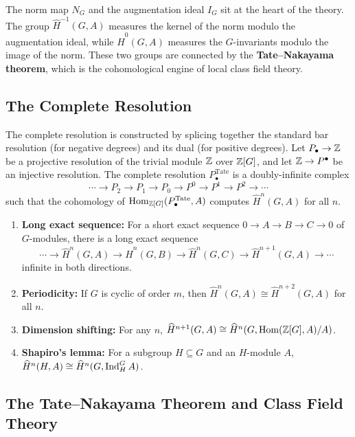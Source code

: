 The norm map \(N_G\) and the augmentation ideal \(I_G\) sit at the heart of the theory. The group \(\widehat{H}^{-1}(G,A)\) measures the kernel of the norm modulo the augmentation ideal, while \(\widehat{H}^{0}(G,A)\) measures the \(G\)-invariants modulo the image of the norm. These two groups are connected by the \textbf{Tate--Nakayama theorem}, which is the cohomological engine of local class field theory.

\subsection{The Complete Resolution}

The complete resolution is constructed by splicing together the standard bar resolution (for negative degrees) and its dual (for positive degrees). Let \(P_\bullet \to \mathbb{Z}\) be a projective resolution of the trivial module \(\mathbb{Z}\) over \(\mathbb{Z}[G]\), and let \(\mathbb{Z} \to P^\bullet\) be an injective resolution. The complete resolution \(P_\bullet^{\text{Tate}}\) is a doubly-infinite complex
\[
\cdots \longrightarrow P_2 \longrightarrow P_1 \longrightarrow P_0 \longrightarrow P^0 \longrightarrow P^1 \longrightarrow P^2 \longrightarrow \cdots
\]
such that the cohomology of \(\operatorname{Hom}_{\mathbb{Z}[G]}(P_\bullet^{\text{Tate}}, A)\) computes \(\widehat{H}^n(G,A)\) for all \(n\).

\begin{theorem}
\begin{enumerate}
    \item \textbf{Long exact sequence:} For a short exact sequence \(0 \to A \to B \to C \to 0\) of \(G\)-modules, there is a long exact sequence
    \[
    \cdots \to \widehat{H}^{n}(G,A) \to \widehat{H}^{n}(G,B) \to \widehat{H}^{n}(G,C) \to \widehat{H}^{n+1}(G,A) \to \cdots
    \]
    infinite in both directions.
    \item \textbf{Periodicity:} If \(G\) is cyclic of order \(m\), then \(\widehat{H}^n(G,A) \cong \widehat{H}^{n+2}(G,A)\) for all \(n\).
    \item \textbf{Dimension shifting:} For any \(n\), \(\widehat{H}^{n+1}(G,A) \cong \widehat{H}^{n}(G, \operatorname{Hom}(\mathbb{Z}[G], A)/A)\).
    \item \textbf{Shapiro's lemma:} For a subgroup \(H \subseteq G\) and an \(H\)-module \(A\), \(\widehat{H}^n(H,A) \cong \widehat{H}^n(G, \operatorname{Ind}_H^G A)\).
\end{enumerate}
\end{theorem}

\subsection{The Tate--Nakayama Theorem and Class Field Theory}

